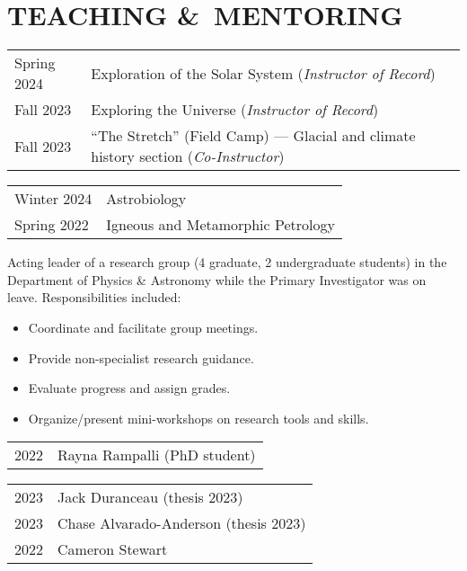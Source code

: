 \section*{TEACHING \&\ MENTORING}
\begin{tabular}{p{.15\linewidth} p{.85\linewidth}} %
	Spring 2024 & Exploration of the Solar System (\emph{Instructor of Record})\\
	Fall 2023 & Exploring the Universe (\emph{Instructor of Record})\\
	Fall 2023 & ``The Stretch'' (Field Camp) --- Glacial and climate history section (\emph{Co-Instructor})
	\end{tabular}

\begin{tabular}{p{.15\linewidth} p{.85\linewidth}} %
	Winter 2024 & Astrobiology\\
	Spring 2022 & Igneous and Metamorphic Petrology
\end{tabular}

Acting leader of a research group (4 graduate, 2 undergraduate students) in the Department of Physics \& Astronomy while the Primary Investigator was on leave. Responsibilities included:
\begin{itemize}
\item Coordinate and facilitate group meetings.
\item Provide non-specialist research guidance.
\item Evaluate progress and assign grades.
\item Organize/present mini-workshops on research tools and skills.
\end{itemize}

\begin{tabular}{ll}
	2022\ongoing & Rayna Rampalli (PhD student)\\
\end{tabular}
\begin{tabular}{ll}
	2023 & Jack Duranceau (thesis 2023)\\
	2023 & Chase Alvarado-Anderson (thesis 2023)\\
	2022 & Cameron Stewart \\
\end{tabular}

